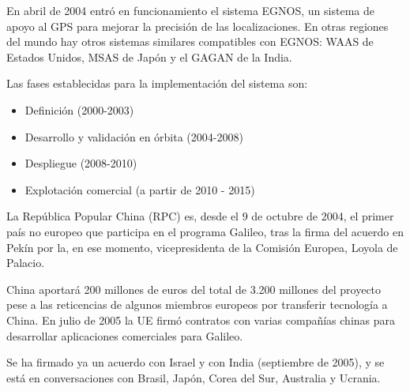 \begin{description}
En abril de 2004 entr\'o en funcionamiento el sistema EGNOS, un sistema de apoyo al GPS para mejorar la precisi\'on de las localizaciones. En otras regiones del mundo hay otros sistemas similares compatibles con EGNOS: WAAS de Estados Unidos, MSAS de Jap\'on y el GAGAN de la India.

Las fases establecidas para la implementaci\'on del sistema son:

\begin{itemize}
\item Definici\'on (2000-2003)
    \item Desarrollo y validaci\'on en \'orbita (2004-2008)
    \item Despliegue (2008-2010)
    \item Explotaci\'on comercial (a partir de 2010 - 2015)
\end{itemize}

La Rep\'ublica Popular China (RPC) es, desde el 9 de octubre de 2004, el primer pa\'is no europeo que participa en el programa Galileo, tras la firma del acuerdo en Pek\'in por la, en ese momento, vicepresidenta de la Comisi\'on Europea, Loyola de Palacio.

China aportar\'a 200 millones de euros del total de 3.200 millones del proyecto pese a las reticencias de algunos miembros europeos por transferir tecnolog\'ia a China. En julio de 2005 la UE firm\'o contratos con varias compa\~n\'ias chinas para desarrollar aplicaciones comerciales para Galileo.

Se ha firmado ya un acuerdo con Israel y con India (septiembre de 2005), y se est\'a en conversaciones con Brasil, Jap\'on, Corea del Sur, Australia y Ucrania.

\end{description}
     
